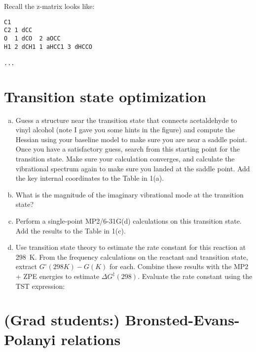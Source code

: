 \documentclass[11pt]{article}
\begin{document}
Recall the z-matrix looks like:

\begin{verbatim}
C1
C2 1 dCC
O  1 dCO  2 aOCC
H1 2 dCH1 1 aHCC1 3 dHCCO

...
\end{verbatim}


\section{Transition state optimization}
\label{sec:org81d3e7a}
\begin{enumerate}[(a)]
\item Guess a structure near the transition state that connects acetaldehyde to vinyl alcohol (note I gave you some hints in the figure) and compute the Hessian using your baseline model to make sure you are near a saddle point.  Once you have a satisfactory guess, search from this starting point for the transition state. Make sure your calculation converges, and calculate the vibrational spectrum again to make sure you landed at the saddle point. Add the key internal coordinates to the Table in 1(a).

\item What is the magnitude of the imaginary vibrational mode at the transition state?

\item Perform a single-point MP2/6-31G(d) calculations on this transition state. Add the results to the Table in 1(c).

\item Use transition state theory to estimate the rate constant for this reaction at \SI{298}{K}.  From the frequency calculations on the reactant and transition state, extract \(G^{\circ}(298 K)- G( K)\) for each.  Combine these results with the MP2 + ZPE energies to estimate \(\Delta G^{\ddagger}(298)\).  Evaluate the rate constant using the TST expression:
\end{enumerate}

\section{(Grad students:) Bronsted-Evans-Polanyi relations}
\label{sec:orgfdaec27}
\end{document}
